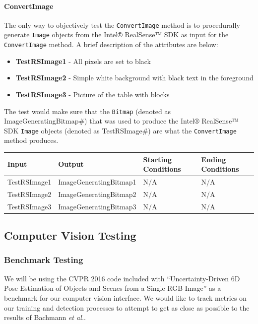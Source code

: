 \documentclass[12pt]{article}
\providecommand{\tightlist}{%
  \setlength{\itemsep}{0pt}\setlength{\parskip}{0pt}}
\begin{document}
\paragraph{ConvertImage}\label{convertimage}

The only way to objectively test the \texttt{ConvertImage} method is to
procedurally generate \texttt{Image} objects from the Intel® RealSense™
SDK as input for the \texttt{ConvertImage} method. A brief description
of the attributes are below:

\begin{itemize}
\tightlist
\item
  \textbf{TestRSImage1} - All pixels are set to black
\item
  \textbf{TestRSImage2} - Simple white background with black text in the
  foreground
\item
  \textbf{TestRSImage3} - Picture of the table with blocks
\end{itemize}

The test would make sure that the \texttt{Bitmap} (denoted as
ImageGeneratingBitmap\#) that was used to produce the Intel® RealSense™
SDK \texttt{Image} objects (denoted as TestRSImage\#) are what the
\texttt{ConvertImage} method produces.

\begin{longtable}[]{@{}llll@{}}
\toprule
Input & Output & Starting Conditions & Ending Conditions\tabularnewline
\midrule
\endhead
TestRSImage1 & ImageGeneratingBitmap1 & N/A & N/A\tabularnewline
TestRSImage2 & ImageGeneratingBitmap2 & N/A & N/A\tabularnewline
TestRSImage3 & ImageGeneratingBitmap3 & N/A & N/A\tabularnewline
\bottomrule
\end{longtable}

\subsection{Computer Vision Testing}\label{computer-vision-testing}

\subsubsection{Benchmark Testing}\label{benchmark-testing}

We will be using the CVPR 2016 code included with ``Uncertainty-Driven
6D Pose Estimation of Objects and Scenes from a Single RGB Image'' as a
benchmark for our computer vision interface. We would like to track
metrics on our training and detection processes to attempt to get as
close as possible to the results of Bachmann \emph{et al.}.
\end{document}

